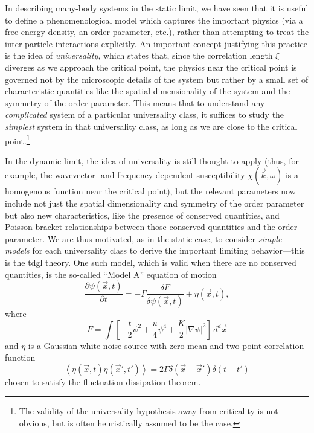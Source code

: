 In describing many-body systems in the static limit, we have seen that it is useful to define a phenomenological model which captures the important physics (via a free energy density, an order parameter, etc.), rather than attempting to treat the inter-particle interactions explicitly.
An important concept justifying this practice is the idea of \emph{universality}, which states that, since the correlation length $\xi$ diverges as we approach the critical point, the physics near the critical point is governed not by the microscopic details of the system but rather by a small set of characteristic quantities like the spatial dimensionality of the system and the symmetry of the order parameter\citep{wilson_renormalization_1974}.
This means that to understand any \emph{complicated} system of a particular universality class, it suffices to study the \emph{simplest} system in that universality class, as long as we are close to the critical point.\footnote{The validity of the universality hypothesis away from criticality is not obvious, but is often heuristically assumed to be the case.}

In the dynamic limit, the idea of universality is still thought to apply (thus, for example, the wavevector- and frequency-dependent susceptibility $\chi(\vec{k}, \omega)$ is a homogenous function near the critical point), but the relevant parameters now include not just the spatial dimensionality and symmetry of the order parameter but also new characteristics, like the presence of conserved quantities, and Poisson-bracket relationships between those conserved quantities and the order parameter\citep{hohenberg_theory_1977}.
We are thus motivated, as in the static case, to consider \emph{simple models} for each universality class to derive the important limiting behavior---this is the \gls{tdgl} theory.
One such model, which is valid when there are no conserved quantities, is the so-called ``Model A'' equation of motion
\begin{equation}\label{eq:modelaequation}
\frac{\partial\psi(\vec{x}, t)}{\partial t} = -\Gamma \frac{\delta F}{\delta \psi(\vec{x}, t)}+\eta(\vec{x}, t),
\end{equation}
where
\begin{equation}
F = \int \left[-\frac{t}{2}\psi^2+\frac{u}{4}\psi^4+\frac{K}{2}|\nabla \psi|^2\right] \, d^d\vec{x}
\end{equation}
and $\eta$ is a Gaussian white noise source with zero mean and two-point correlation function
\begin{equation}
\left<\eta(\vec{x}, t)\eta(\vec{x}', t')\right>=2\Gamma \delta(\vec{x}-\vec{x}')\delta(t-t')
\end{equation}
chosen to satisfy the fluctuation-dissipation theorem.

